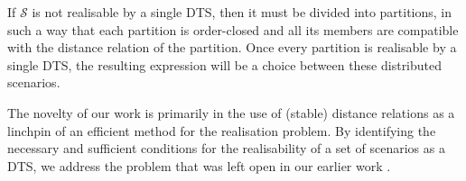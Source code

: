 If $\mathcal{S}$ is not realisable by a single DTS,
then it must be divided into
partitions, in such a way that each partition is order-closed and all
its members are compatible with the distance relation of the
partition. Once every partition is realisable by a single DTS, the
resulting expression will be a choice between these
distributed scenarios.

The novelty of our work is primarily in the use of (stable) distance
relations \cite{DTS-2025} as a linchpin of an efficient method
for the realisation problem.
By identifying the necessary and sufficient conditions for the
realisability of a set of scenarios as a DTS, we address the problem
that was left open in our earlier work \cite{DTS-2025}.




